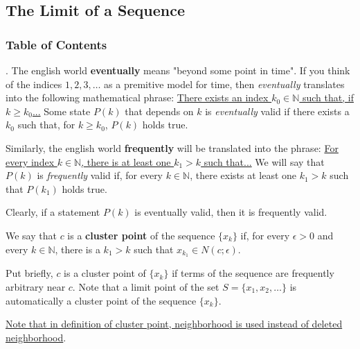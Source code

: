 \documentclass[8pt]{beamer}
\newcommand{\mbb}[1]{\mathbb{#1}}
\newcommand{\tb}[1]{\textbf{#1}}
\newcommand{\ti}[1]{\textit{#1}}
\begin{document}
\subsection{The Limit of a Sequence}

\begingroup
    \begin{frame}
        \frametitle{Table of Contents}
        \tableofcontents[currentsubsection]
    \end{frame}
\endgroup

\begin{frame}{.}
    The english world \tb{eventually} means "beyond some point in time".
    If you think of the indices $1,2,3,\dots$ as a premitive model for time, then \ti{eventually} translates into the following mathematical phrase: \underline{There exists an index $k_0 \in \mbb{N}$ such that, if $k \geq k_0$...}
    Some state $P(k)$ that depends on $k$ is \ti{eventually} valid if there exists a $k_0$ such that, for $k \geq k_0$, $P(k)$ holds true.

    \smallskip
    Similarly, the english world \tb{frequently} will be translated into the phrase: \underline{For every index $k\in\mbb{N}$, there is at least one $k_1 > k$ such that...}
    We will say that $P(k)$ is \ti{frequently} valid if, for every $k \in \mbb{N}$, there exists at least one $k_1 > k$ such that $P(k_1)$ holds true.

    \smallskip
    Clearly, if a statement $P(k)$ is eventually valid, then it is frequently valid.

    \begin{definition}
        We say that $c$ is a \tb{cluster point} of the sequence $\{x_k\}$ if, for every $\epsilon> 0$ and every $k \in \mbb{N}$, there is a $k_1 > k$ such that $x_{k_1} \in N(c; \epsilon)$.
    \end{definition}

    Put briefly, $c$ is a cluster point of $\{x_k\}$ if terms of the sequence are frequently arbitrary near $c$.
    Note that a limit point of the set $S = \{x_1, x_2, \dots\}$ is automatically a cluster point of the sequence $\{x_k\}$.

    \underline{Note that in definition of cluster point, neighborhood is used instead of deleted} 
    \underline{neighborhood}.
\end{frame}
\end{document}
